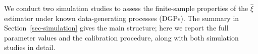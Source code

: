 We conduct two simulation studies to assess the finite-sample properties
of the $\hat\xi$ estimator under known data-generating processes
(DGPs). The summary in Section~\ref{sec-simulation} gives the main
structure; here we report the full parameter values and the calibration
procedure, along with both simulation studies in detail.







